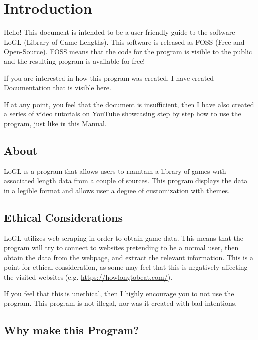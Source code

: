\section{Introduction}

Hello! This document is intended to be a user-friendly guide to the
software LoGL (Library of Game Lengths). This software is released as
FOSS (Free and Open-Source).
FOSS means that the code for the program is visible to
the public and the resulting program is available for free!

If you are interested in how this program was created, I have created
Documentation that is
\href{https://github.com/EZRA-DVLPR/GameList/blob/main/docs/PDF/Documentation.pdf}{visible
here.}

If at any point, you feel that the document is insufficient, then I
have also created a series of video tutorials on YouTube showcasing
step by step how to use the program, just like in this Manual.

\subsection{About}

LoGL is a program that allows users to maintain a library of games
with associated length data from a couple of sources. This program
displays the data in a legible format and allows user a degree of
customization with themes.

\subsection{Ethical Considerations}

LoGL utilizes web scraping in order to obtain game data. This means
that the program will try to connect to websites pretending to be a
normal user, then obtain the data from the webpage, and extract the
relevant information. This is a point for ethical consideration, as
some may feel that this is negatively affecting the visited
websites (e.g. \href{https://howlongtobeat.com/}{https://howlongtobeat.com/}).

If you feel that this is unethical, then I highly encourage you to
not use the program. This program is not illegal, nor was it created
with bad intentions.

\subsection{Why make this Program?}

